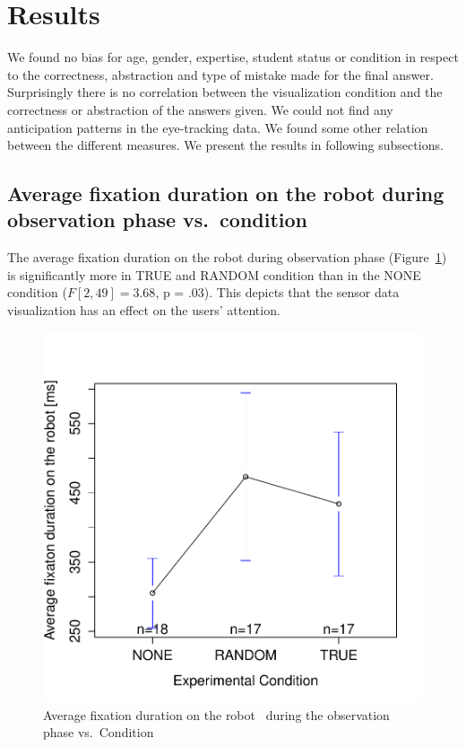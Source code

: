 \documentclass{sig-alternate}
\begin{document}

\section{Results}

We found no bias for age, gender, expertise, student status or condition
in respect to the correctness, abstraction and type of mistake made for
the final answer. Surprisingly there is no correlation between the
visualization condition and the correctness or abstraction of the
answers given. We could not find any anticipation patterns in the
eye-tracking data. We found some other relation between the different
measures. We present the results in following subsections.

\subsection{Average fixation duration on the robot during observation phase
vs.~condition}

The average fixation duration on the robot during observation phase
(Figure~\ref{res1}) is significantly more in {\sf TRUE} and {\sf RANDOM} condition than in
the {\sf NONE} condition ($F[2,49]=3.68$, p = .03). This depicts that the
sensor data visualization has an effect on the users' attention.

\begin{figure}[h!]
    \centering
    \includegraphics[width=0.8\linewidth]{meanPlotFixRobo}
    \caption{Average fixation duration on the robot ~during the observation phase
    vs.~Condition}
    \label{res1}
\end{figure}
\end{document}
